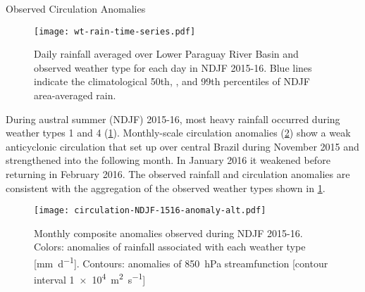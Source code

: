 \begin{block}{Observed Circulation Anomalies}
  \begin{mdframed}
  \begin{figure}
    \caption{
  		Daily rainfall averaged over Lower Paraguay River Basin and observed weather type for each day in NDJF 2015-16.
      Blue lines indicate the climatological 50th, , and 99th percentiles of NDJF area-averaged rain.
      \label{fig:rain-wt}
  	}
    \noindent\texttt{[image: wt-rain-time-series.pdf]}
    \end{figure}
  \end{mdframed}

  During austral summer (NDJF) 2015-16, most heavy rainfall occurred during weather types 1 and 4 (\cref{fig:rain-wt}).
  Monthly-scale circulation anomalies (\cref{fig:anomalies}) show a weak anticyclonic circulation that set up over central Brazil during November 2015 and strengthened into the following month.
  In January 2016 it weakened before returning in February 2016.
  The observed rainfall and circulation anomalies are consistent with the aggregation of the observed weather types shown in \cref{fig:rain-wt}.

  \begin{mdframed}
  \begin{figure}
  	\noindent\texttt{[image: circulation-NDJF-1516-anomaly-alt.pdf]}
  	\caption{
      	Monthly composite anomalies observed during NDJF 2015-16.
        Colors: anomalies of rainfall associated with each weather type [\si{\milli\meter\per\day}].
        Contours: anomalies of \SI{850}{\hecto\pascal} streamfunction [contour interval \SI{1e4}{\meter\squared\per\second}]
        \label{fig:anomalies}
  	}
  \end{figure}
  \end{mdframed}
\end{block}

